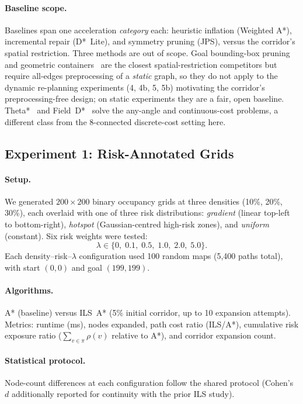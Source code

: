 \documentclass[preprint,12pt,authoryear]{elsarticle}
\begin{document}
\paragraph{Baseline scope.}
Baselines span one acceleration \emph{category} each: heuristic inflation (Weighted A*), incremental repair (D*~Lite), and symmetry pruning (JPS), versus the corridor's spatial restriction. Three methods are out of scope. Goal bounding-box pruning~\citep{Rabin2016} and geometric containers~\citep{Wagner2005} are the closest spatial-restriction competitors but require all-edges preprocessing of a \emph{static} graph, so they do not apply to the dynamic re-planning experiments (4, 4b, 5, 5b) motivating the corridor's preprocessing-free design; on static experiments they are a fair, open baseline. Theta*~\citep{Nash2007} and Field~D*~\citep{Ferguson2005} solve the any-angle and continuous-cost problems, a different class from the 8-connected discrete-cost setting here.

\subsection{Experiment 1: Risk-Annotated Grids}

\paragraph{Setup.}
We generated $200 \times 200$ binary occupancy grids at three densities (10\%, 20\%, 30\%), each overlaid with one of three risk distributions: \emph{gradient} (linear top-left to bottom-right), \emph{hotspot} (Gaussian-centred high-risk zones), and \emph{uniform} (constant). Six risk weights were tested:
\[
\lambda \in \{0,\; 0.1,\; 0.5,\; 1.0,\; 2.0,\; 5.0\}.
\]
Each density--risk--$\lambda$ configuration used 100 random maps (5,400 paths total), with start $(0,0)$ and goal $(199, 199)$.

\paragraph{Algorithms.}
A* (baseline) versus ILS~A* (5\% initial corridor, up to 10 expansion attempts). Metrics: runtime (ms), nodes expanded, path cost ratio (ILS/A*), cumulative risk exposure ratio ($\sum_{v \in \pi}\rho(v)$ relative to A*), and corridor expansion count.

\paragraph{Statistical protocol.}
Node-count differences at each configuration follow the shared protocol (Cohen's $d$ additionally reported for continuity with the prior ILS study).
\end{document}
